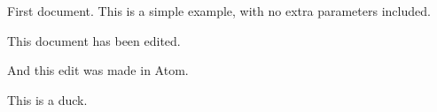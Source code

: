 \documentclass{article}
\begin{document}
First document. This is a simple example, with no
extra parameters included.

This document has been edited.

And this edit was made in Atom.

This is a duck.
\end{document}
